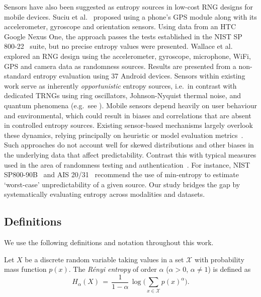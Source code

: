 Sensors have also been suggested as entropy sources in low-cost RNG designs for mobile devices. Suciu et al.~\cite{suciu2011unpredictable} proposed using a phone's GPS module along with its accelerometer, gyroscope and orientation sensors. Using data from an HTC Google Nexus One, the approach passes the tests established in the NIST SP 800-22~\cite{rukhin2001nist} suite, but no precise entropy values were presented.  Wallace et al.~\cite{wallace2016toward} explored an RNG design using the accelerometer, gyroscope, microphone, WiFi, GPS and camera data as randomness sources. Results are presented from a non-standard entropy evaluation using 37 Android devices. Sensors within existing work serve as inherently \emph{opportunistic} entropy sources, i.e.\ in contrast with dedicated TRNGs using ring oscillators, Johnson-Nyquist thermal noise, and quantum phenomena (e.g.\ see \cite{hurley2020quantum}). Mobile sensors depend heavily on user behaviour and environmental, which could result in biases and correlations that are absent in controlled entropy sources. Existing sensor-based mechanisms largely overlook these dynamics, relying principally on heuristic or model evaluation metrics~\cite{riva2012progressive,li2013unobservable}. Such approaches do not account well for skewed distributions and other biases in the underlying data that affect predictability.  Contrast this with typical measures used in the area of randomness testing and authentication~\cite{mai2017guessability,uellenbeck2013quantifying,hurley2020quantum,turan2018recommendation,bsi2024ais31}. For instance, NIST SP800-90B~\cite{turan2018recommendation} and AIS 20/31~\cite{bsi2024ais31} recommend the use of min-entropy to estimate `worst-case' unpredictability of a given source. Our study bridges the gap by systematically evaluating entropy across modalities and datasets.


\subsection{Definitions}
\label{sec:defs}
We use the following definitions and notation throughout this work.



\begin{definition}
Let \(X\) be a discrete random variable taking values in a set \(\mathcal{X}\) with probability mass function \(p(x)\). 
The \emph{R\'{e}nyi entropy} of order \(\alpha\) (\(\alpha > 0\), \(\alpha \neq 1\)) is defined as
\begin{equation}
H_{\alpha}(X)
\,=\, \frac{1}{1 - \alpha} \,\log\!\Biggl(\sum_{x \in \mathcal{X}} p(x)^{\alpha}\Biggr).
\label{eq:renyi_entropy_general}
\end{equation}
\end{definition}

